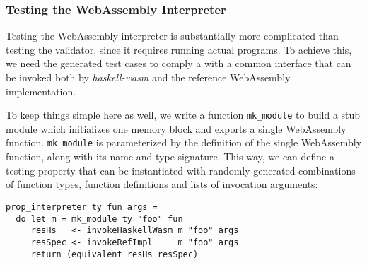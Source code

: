 \documentclass[sigconf, anonymous]{acmart}
\begin{document}


\subsubsection{Testing the WebAssembly Interpreter}

Testing the WebAssembly interpreter is substantially more complicated than
testing the validator, since it requires running actual programs.
%
To achieve this, we need the generated test cases to comply a with a common
interface that can be invoked both by \textit{haskell-wasm} and the reference
WebAssembly implementation.


To keep things simple here as well, we write a function \texttt{mk\_module} to
build a stub module which initializes one memory block and exports a single
WebAssembly function.
%
\texttt{mk\_module} is parameterized by the definition of the single WebAssembly
function, along with its name and type signature.
%
%
%
This way, we can define a testing property that can be instantiated with
randomly generated combinations of function types, function definitions and
lists of invocation arguments:


\begin{verbatim}
prop_interpreter ty fun args =
  do let m = mk_module ty "foo" fun
     resHs   <- invokeHaskellWasm m "foo" args
     resSpec <- invokeRefImpl     m "foo" args
     return (equivalent resHs resSpec)
\end{verbatim}
\end{document}
